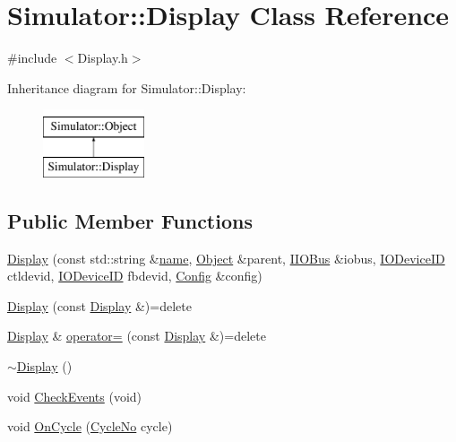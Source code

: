 \hypertarget{class_simulator_1_1_display}{\section{Simulator\+:\+:Display Class Reference}
\label{class_simulator_1_1_display}
}


{\ttfamily \#include $<$Display.\+h$>$}

Inheritance diagram for Simulator\+:\+:Display\+:\begin{figure}[H]
\begin{center}
\leavevmode
\includegraphics[height=2.000000cm]{class_simulator_1_1_display}
\end{center}
\end{figure}
\subsection*{Public Member Functions}
\begin{DoxyCompactItemize}
\item 
\hyperlink{class_simulator_1_1_display_a9e8dd95d8d8d6f6a68a8a7aabe29b400}{Display} (const std\+::string \&\hyperlink{mtconf_8c_a8f8f80d37794cde9472343e4487ba3eb}{name}, \hyperlink{class_simulator_1_1_object}{Object} \&parent, \hyperlink{class_simulator_1_1_i_i_o_bus}{I\+I\+O\+Bus} \&iobus, \hyperlink{namespace_simulator_a3493d987c866ad6b8aaa704c42502db0}{I\+O\+Device\+I\+D} ctldevid, \hyperlink{namespace_simulator_a3493d987c866ad6b8aaa704c42502db0}{I\+O\+Device\+I\+D} fbdevid, \hyperlink{class_config}{Config} \&config)
\item 
\hyperlink{class_simulator_1_1_display_aaad56ddda9a85cfeb1c3cdec28ba62e5}{Display} (const \hyperlink{class_simulator_1_1_display}{Display} \&)=delete
\item 
\hyperlink{class_simulator_1_1_display}{Display} \& \hyperlink{class_simulator_1_1_display_a2062fb4d91091b3793a8b81d57c4e4ba}{operator=} (const \hyperlink{class_simulator_1_1_display}{Display} \&)=delete
\item 
\hyperlink{class_simulator_1_1_display_abbb1e81edfa7c0067b403b8ccde20091}{$\sim$\+Display} ()
\item 
void \hyperlink{class_simulator_1_1_display_a49e90cfde0aef86aa7d98343621d7432}{Check\+Events} (void)
\item 
void \hyperlink{class_simulator_1_1_display_adb2a9249e4163dea8ef1457aff79ff5c}{On\+Cycle} (\hyperlink{namespace_simulator_a928f1e2101eba21bb0fe409e8c9ce573}{Cycle\+No} cycle)
\end{DoxyCompactItemize}
